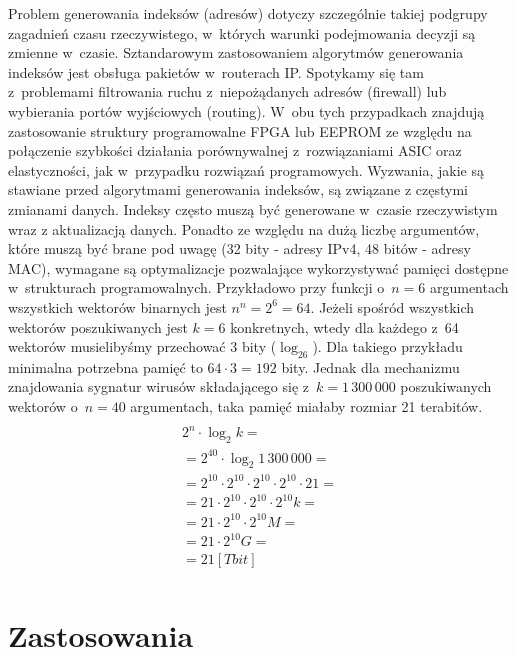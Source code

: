 Problem generowania indeksów (adresów) dotyczy szczególnie takiej podgrupy zagadnień czasu rzeczywistego,
w~których warunki podejmowania decyzji są zmienne w~czasie.
Sztandarowym zastosowaniem algorytmów generowania indeksów jest obsługa pakietów w~routerach IP.
Spotykamy się tam z~problemami filtrowania ruchu z~niepożądanych adresów (firewall) lub wybierania portów wyjściowych (routing).
W~obu tych przypadkach znajdują zastosowanie struktury programowalne FPGA lub EEPROM
ze względu na połączenie szybkości działania porównywalnej z~rozwiązaniami ASIC oraz elastyczności,
jak w~przypadku rozwiązań programowych.
Wyzwania,
jakie są stawiane przed algorytmami generowania indeksów,
są związane z częstymi zmianami danych.
Indeksy często muszą być generowane w~czasie rzeczywistym wraz z aktualizacją danych.
Ponadto ze względu na dużą liczbę argumentów,
które muszą być brane pod uwagę (32 bity - adresy IPv4, 48 bitów - adresy MAC),
wymagane są optymalizacje pozwalające wykorzystywać pamięci dostępne w~strukturach programowalnych.
Przykładowo przy funkcji o~$n=6$ argumentach wszystkich wektorów binarnych jest $n^n = 2^6 = 64$.
Jeżeli spośród wszystkich wektorów poszukiwanych jest $k=6$ konkretnych, wtedy dla każdego z~64 wektorów musielibyśmy przechować 3 bity ($\log_26$).
Dla takiego przykładu minimalna potrzebna pamięć to $64 \cdot 3 = 192$ bity.
Jednak dla mechanizmu znajdowania sygnatur wirusów składającego się z~$k=1\,300\,000$ poszukiwanych wektorów o~$n=40$ argumentach, taka pamięć miałaby rozmiar 21 terabitów.
\begin{multline} \\
2^n \cdot \log_2 k = \\
= 2^{40} \cdot \log_2 1\,300\,000 = \\
= 2^{10} \cdot 2^{10} \cdot 2^{10} \cdot 2^{10} \cdot 21 = \\
=21 \cdot 2^{10} \cdot 2^{10} \cdot 2^{10} k = \\
=21 \cdot 2^{10} \cdot 2^{10} M = \\
=21 \cdot 2^{10} G = \\
=21 [Tbit] \\
\end{multline}

\section{Zastosowania}


